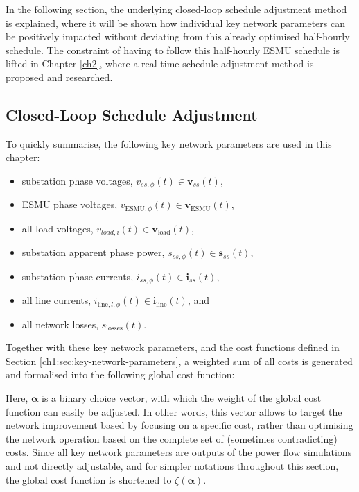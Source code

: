 In the following section, the underlying closed-loop schedule adjustment method is explained, where it will be shown how individual key network parameters can be positively impacted without deviating from this already optimised half-hourly schedule.
The constraint of having to follow this half-hourly ESMU schedule is lifted in Chapter \ref{ch2}, where a real-time schedule adjustment method is proposed and researched.

\subsection{Closed-Loop Schedule Adjustment}

To quickly summarise, the following key network parameters are used in this chapter:

\begin{itemize}
	\item substation phase voltages, $v_{ss,\phi}(t) \in \textbf{v}_{ss}(t)$,
	\item ESMU phase voltages, $v_{\text{ESMU},\phi}(t) \in \textbf{v}_\text{ESMU}(t)$,
	\item all load voltages, $v_{load,i}(t) \in \textbf{v}_\text{load}(t)$,
	\item substation apparent phase power, $s_{ss,\phi}(t) \in \textbf{s}_{ss}(t)$,
	\item substation phase currents, $i_{ss,\phi}(t) \in \textbf{i}_{ss}(t)$,
	\item all line currents, $i_{\text{line},l,\phi}(t) \in \textbf{i}_\text{line}(t)$, and
	\item all network losses, $s_\text{losses}(t)$.
\end{itemize}

Together with these key network parameters, and the cost functions defined in Section \ref{ch1:sec:key-network-parameters}, a weighted sum of all costs is generated and formalised into the following global cost function:



Here, $\boldsymbol{\alpha}$ is a binary choice vector, with which the weight of the global cost function can easily be adjusted.
In other words, this vector allows to target the network improvement based by focusing on a specific cost, rather than optimising the network operation based on the complete set of (sometimes contradicting) costs.
Since all key network parameters are outputs of the power flow simulations and not directly adjustable, and for simpler notations throughout this section, the global cost function is shortened to $\zeta(\boldsymbol{\alpha})$.

